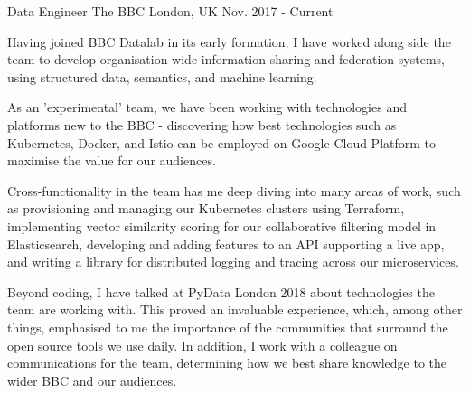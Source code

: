 \begin{cventries}
    
    \cventry
        {Data Engineer}
        {The BBC}
        {London, UK}
        {Nov. 2017 - Current}
        {
            \begin{cvitems}
                \item{Having joined BBC Datalab in its early formation, I have worked along side the team to develop organisation-wide information sharing and federation systems, using structured data, semantics, and machine learning.}
                \item{As an 'experimental' team, we have been working with technologies and platforms new to the BBC - discovering how best technologies such as Kubernetes, Docker, and Istio can be employed on Google Cloud Platform to maximise the value for our audiences.}
                \item{Cross-functionality in the team has me deep diving into many areas of work, such as provisioning and managing our Kubernetes clusters using Terraform, implementing vector similarity scoring for our collaborative filtering model in Elasticsearch, developing and adding features to an API supporting a live app, and writing a library for distributed logging and tracing across our microservices.}
                \item{Beyond coding, I have talked at PyData London 2018 about technologies the team are working with. This proved an invaluable experience, which, among other things, emphasised to me the importance of the communities that surround the open source tools we use daily. In addition, I work with a colleague on communications for the team, determining how we best share knowledge to the wider BBC and our audiences.}
            \end{cvitems}
        }
        \vspace{-0.2cm}



\end{cventries}
